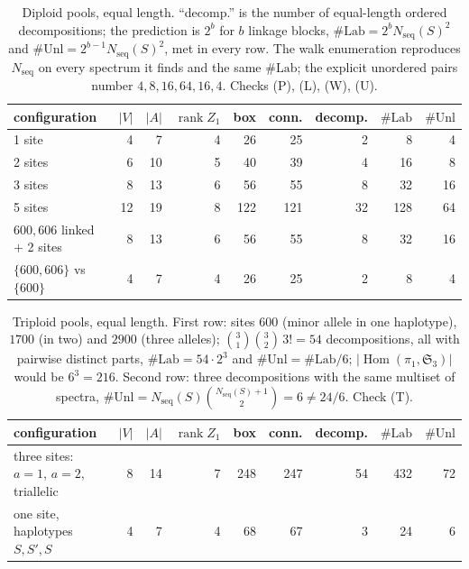 \documentclass[11pt]{article}
\theoremstyle{plain}
\theoremstyle{definition}
\theoremstyle{remark}
\newcommand{\rank}{\operatorname{rank}}
\newcommand{\Hom}{\operatorname{Hom}}
\newcommand{\Nseq}{N_{\mathrm{seq}}}
\newcommand{\Lab}{\#\mathrm{Lab}}
\newcommand{\Unl}{\#\mathrm{Unl}}
\newcommand{\Sym}{\mathfrak{S}}
\begin{document}
\begin{table}[t]
\centering
\small
\begin{tabular}{lrrrrrrrr}
\toprule
configuration & $|V|$ & $|A|$ & $\rank Z_1$ & box & conn. & decomp. & $\Lab$ & $\Unl$\\
\midrule
1 site              &  4 &  7 & 4 &  26 &  25 &  2 &   8 &  4\\
2 sites             &  6 & 10 & 5 &  40 &  39 &  4 &  16 &  8\\
3 sites             &  8 & 13 & 6 &  56 &  55 &  8 &  32 & 16\\
5 sites             & 12 & 19 & 8 & 122 & 121 & 32 & 128 & 64\\
$600,606$ linked $+$ 2 sites & 8 & 13 & 6 & 56 & 55 & 8 & 32 & 16\\
$\{600,606\}$ vs $\{600\}$   & 4 &  7 & 4 & 26 & 25 & 2 &  8 &  4\\
\bottomrule
\end{tabular}
\caption{Diploid pools, equal length. ``decomp.'' is the number of equal-length ordered
decompositions; the prediction is $2^b$ for $b$ linkage blocks, $\Lab=2^b\Nseq(S)^2$ and
$\Unl=2^{b-1}\Nseq(S)^2$, met in every row. The walk enumeration reproduces $\Nseq$ on every
spectrum it finds and the same $\Lab$; the explicit unordered pairs number $4,8,16,64,16,4$.
Checks (P), (L), (W), (U).}
\label{tab:diploid}
\end{table}

\begin{table}[t]
\centering
\small
\begin{tabular}{lrrrrrrrr}
\toprule
configuration & $|V|$ & $|A|$ & $\rank Z_1$ & box & conn. & decomp. & $\Lab$ & $\Unl$\\
\midrule
three sites: $a=1$, $a=2$, triallelic & 8 & 14 & 7 & 248 & 247 & 54 & 432 & 72\\
one site, haplotypes $S,S',S$ & 4 & 7 & 4 & 68 & 67 & 3 & 24 & 6\\
\bottomrule
\end{tabular}
\caption{Triploid pools, equal length. First row: sites $600$ (minor allele in one haplotype),
$1700$ (in two) and $2900$ (three alleles); $\binom31\binom32\,3!=54$ decompositions, all
with pairwise distinct parts, $\Lab=54\cdot2^3$ and $\Unl=\Lab/6$; $|\Hom(\pi_1,\Sym_3)|$ would
be $6^3=216$. Second row: three decompositions with the same multiset of spectra,
$\Unl=\Nseq(S)\binom{\Nseq(S)+1}{2}=6\ne24/6$. Check (T).}
\label{tab:triploid}
\end{table}
\end{document}
